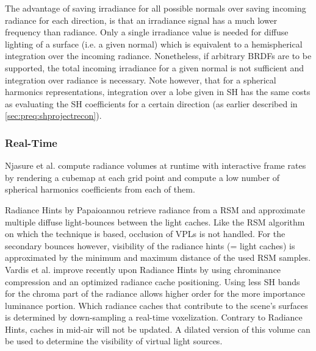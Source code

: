 \documentclass[thesis.tex]{subfiles}
\begin{document}
The advantage of saving irradiance for all possible normals over saving incoming radiance for each direction, is that an irradiance signal has a much lower frequency than radiance.
Only a single irradiance value is needed for diffuse lighting of a surface (i.e. a given normal) which is equivalent to a hemispherical integration over the incoming radiance.
Nonetheless, if arbitrary BRDFs are to be supported, the total incoming irradiance for a given normal is not sufficient and integration over radiance is necessary.
Note however, that for a spherical harmonics representations, integration over a lobe given in SH has the same costs as evaluating the SH coefficients for a certain direction (as earlier described in \autoref{sec:preq:shprojectrecon}).

\subsubsection{Real-Time}
Njasure et al. \cite{bib:nijasure:rtirradiancevol} compute radiance volumes at runtime with interactive frame rates by rendering a cubemap at each grid point and compute a low number of spherical harmonics coefficients from each of them.

Radiance Hints by Papaioannou \cite{bib:radiancehints} retrieve radiance from a RSM and approximate multiple diffuse light-bounces between the light caches.
Like the RSM algorithm on which the technique is based, occlusion of VPLs is not handled.
For the secondary bounces however, visibility of the radiance hints (= light caches) is approximated by the minimum and maximum distance of the used RSM samples.
\\
Vardis et al. \cite{bib:radiancecachechromaticcompression} improve recently upon Radiance Hints by using chrominance compression and an optimized radiance cache positioning.
Using less SH bands for the chroma part of the radiance allows higher order for the more importance luminance portion.
Which radiance caches that contribute to the scene's surfaces is determined by down-sampling a real-time voxelization.
Contrary to Radiance Hints, caches in mid-air will not be updated.
A dilated version of this volume can be used to determine the visibility of virtual light sources.
\end{document}
